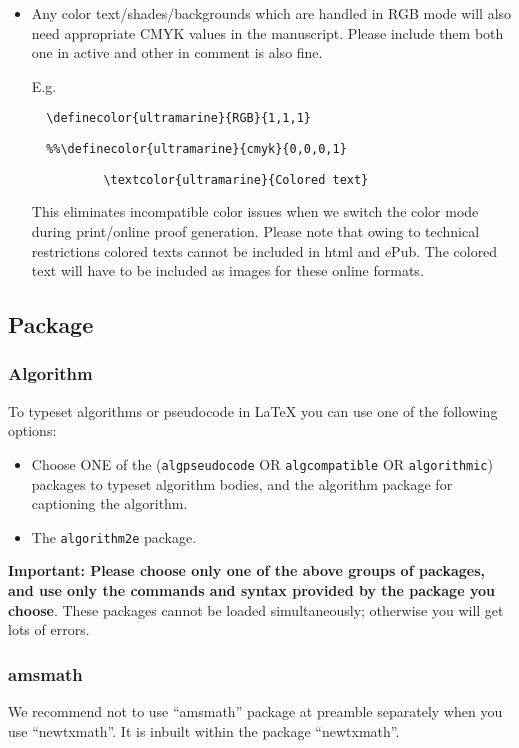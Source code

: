 \documentclass[graybox]{svmono}
\begin{document}
\begin{itemize}
\item Any color text/shades/backgrounds which are handled in RGB mode will also need appropriate CMYK values in the manuscript. Please include them both one in active and other in comment is also fine. 
    
\noindent
E.g. 
\begin{center}
\verb|	\definecolor{ultramarine}{RGB}{1,1,1}|

\verb|	%%\definecolor{ultramarine}{cmyk}{0,0,0,1}|
		
\verb|	        \textcolor{ultramarine}{Colored text}|
\end{center}
    
\eject

\noindent
This eliminates incompatible color issues when we switch the color mode during print/online proof generation. Please note that owing to technical restrictions colored texts cannot be included in html and ePub. The colored text will have to be included as images for these online formats.

\end{itemize}

\subsection*{Package}

\subsubsection*{Algorithm}

To typeset algorithms or pseudocode in LaTeX you can use one of the following options: 

\begin{itemize}
\item Choose ONE of the (\texttt{algpseudocode} OR \texttt{algcompatible} OR \texttt{algorithmic}) packages to typeset algorithm bodies, and the algorithm package for captioning the algorithm.

\item The \texttt{algorithm2e} package.
\end{itemize}

\noindent
\textbf{Important: Please choose only one of the above groups of packages, and use only the commands and syntax provided by the package you choose}. These packages cannot be loaded simultaneously; otherwise you will get lots of errors.


\subsubsection*{amsmath} 
We recommend not to use ``amsmath'' package at preamble separately when you use ``newtxmath''. It is inbuilt within the package ``newtxmath''.
\end{document}
